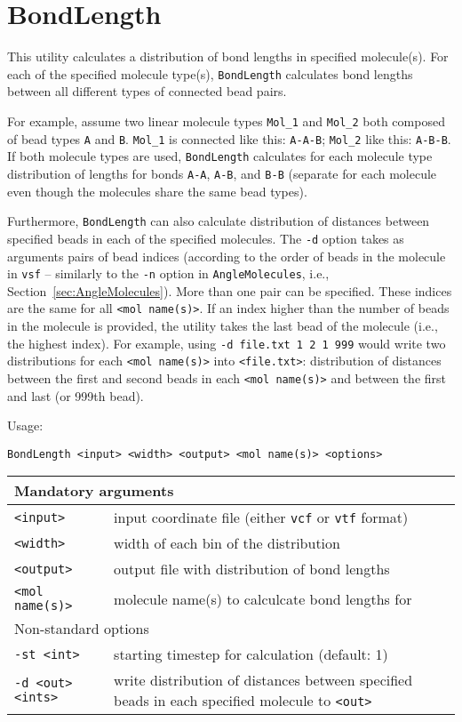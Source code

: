 \section{BondLength} \label{sec:BondLength}

This utility calculates a distribution of bond lengths in specified
molecule(s). For each of the specified molecule type(s),
\texttt{BondLength} calculates bond lengths between all different types of
connected bead pairs.

For example, assume two linear molecule types \texttt{Mol\_1} and
\texttt{Mol\_2} both composed of bead types \texttt{A} and \texttt{B}.
\texttt{Mol\_1} is connected like this: \texttt{A-A-B}; \texttt{Mol\_2}
like this: \texttt{A-B-B}. If both molecule types are used,
\texttt{BondLength} calculates for each molecule type distribution of
lengths for bonds \texttt{A-A}, \texttt{A-B}, and \texttt{B-B} (separate
for each molecule even though the molecules share the same bead types).

Furthermore, \texttt{BondLength} can also calculate distribution of
distances between specified beads in each of the specified molecules. The
\texttt{-d} option takes as arguments pairs of bead indices (according to
the order of beads in the molecule in \texttt{vsf} -- similarly to the
\texttt{-n} option in \texttt{AngleMolecules}, i.e.,
Section~\ref{sec:AngleMolecules}). More than one pair can be specified.
These indices are the same for all \texttt{<mol name(s)>}. If an index
higher than the number of beads in the molecule is provided, the utility
takes the last bead of the molecule (i.e., the highest index). For example,
using \texttt{-d file.txt 1 2 1 999} would write two distributions for each
\texttt{<mol name(s)>} into \texttt{<file.txt>}: distribution of distances
between the first and second beads in each \texttt{<mol name(s)>} and
between the first and last (or 999th bead).

Usage:

\vspace{1em}
\noindent
\texttt{BondLength <input> <width> <output> <mol name(s)> <options>}

\noindent
\begin{longtable}{p{}p{}}
  \toprule
  \multicolumn{2}{l}{Mandatory arguments} \\
  \midrule
  \texttt{<input>} & input coordinate file (either \texttt{vcf} or
    \texttt{vtf} format) \\
  \texttt{<width>} & width of each bin of the distribution \\
  \texttt{<output>} & output file with distribution of bond lengths \\
  \texttt{<mol name(s)>} & molecule name(s) to calculcate bond lengths for \\
  \toprule
  \multicolumn{2}{l}{Non-standard options} \\
  \midrule
  \texttt{-st <int>} & starting timestep for calculation (default: 1) \\
  \texttt{-d <out> <ints>} & write distribution of distances
    between specified beads in each specified molecule to \texttt{<out>}\\
  \bottomrule
\end{longtable}

